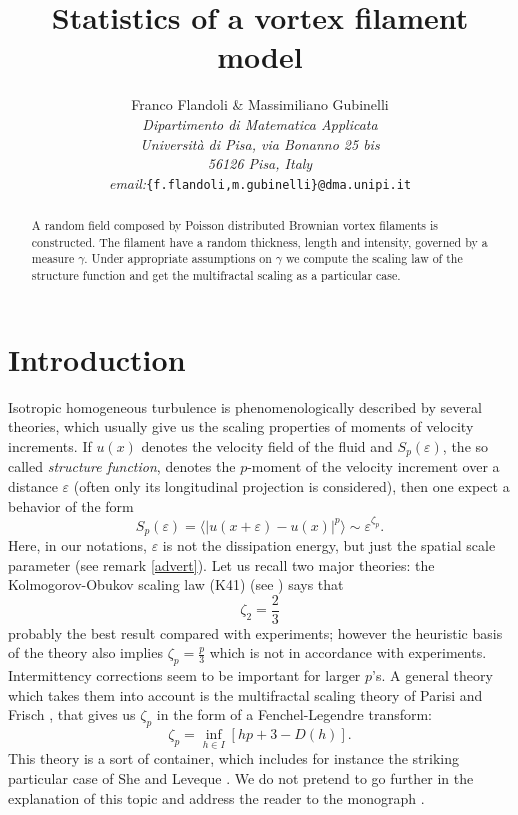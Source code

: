 \documentclass[a4paper,12pt]{article}
\begin{document}
\title{Statistics of a vortex filament model}
\author{{Franco Flandoli \& Massimiliano Gubinelli}\\{\small \textit{Dipartimento di Matematica Applicata}} \\{\small \textit{Universit\`{a} di Pisa, via Bonanno 25 bis}} \\{\small \textit{56126 Pisa, Italy}}\\{\small \textit{email:}\texttt{\{f.flandoli,m.gubinelli\}@dma.unipi.it}}}
\maketitle
\begin{abstract}
A random field composed by Poisson distributed Brownian vortex filaments is
constructed. The filament have a random thickness, length and intensity,
governed by a measure $\gamma$. Under appropriate assumptions on $\gamma$ we
compute the scaling law of the structure function and get the multifractal
scaling as a particular case.
\end{abstract}


\section{Introduction}

Isotropic homogeneous turbulence is phenomenologically described by several
theories, which usually give us the scaling properties of moments of velocity
increments. If $u(x)$ denotes the velocity field of the fluid and
$S_{p}\left(  \varepsilon\right)  $, the so called \textit{structure
function}, denotes the $p$-moment of the velocity increment over a distance
$\varepsilon$ (often only its longitudinal projection is considered), then one
expect a behavior of the form
\begin{equation}
S_{p}(\varepsilon) = \langle|u(x+\varepsilon)-u(x)|^{p} \rangle\sim
\varepsilon^{\zeta_{p}}. \label{scal}%
\end{equation}
Here, in our notations, $\varepsilon$ is not the dissipation energy, but just
the spatial scale parameter (see remark \ref{advert}). Let us recall two major
theories: the Kolmogorov-Obukov scaling law (K41) (see \cite{Kol}) says that
\[
\zeta_{2}=\frac{2}{3}%
\]
probably the best result compared with experiments; however the heuristic
basis of the theory also implies $\zeta_{p}=\frac{p}{3}$ which is not in
accordance with experiments. Intermittency corrections seem to be important
for larger $p$'s. A general theory which takes them into account is the
multifractal scaling theory of Parisi and Frisch \cite{Parisi-Frisch}, that
gives us $\zeta_{p}$ in the form of a Fenchel-Legendre transform:
\[
\zeta_{p}=\inf_{h\in I}[hp+3-D(h)].
\]
This theory is a sort of container, which includes for instance the striking
particular case of She and Leveque \cite{she}. We do not pretend to go further
in the explanation of this topic and address the reader to the monograph
\cite{frisch}.
\end{document}
